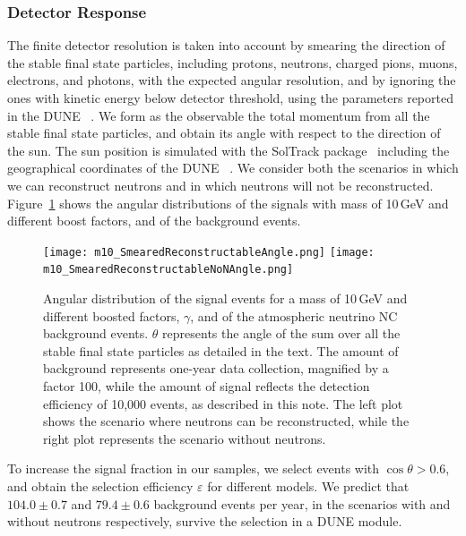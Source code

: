 \subsubsection{Detector Response}
\label{sec:detector_resp}

The finite detector resolution is taken into
account by smearing the direction of the stable final state particles, 
including protons, neutrons, charged pions, muons, electrons, and photons,
with the expected angular resolution,
and by ignoring the ones with kinetic energy below detector threshold,
using the parameters reported in the DUNE ~\cite{Acciarri:2015uup}.
We form as the observable the total momentum from all the stable final state particles,
and obtain its angle with respect to the direction of the sun.
The sun position is simulated with the SolTrack package~\cite{SolTrack}
including the geographical coordinates of the DUNE ~\cite{DUNE_DocDB136}.
We consider both the scenarios in which we can reconstruct neutrons and in which 
neutrons will not be reconstructed.
Figure~\ref{fig:m10_SmearedReconstructableAngle} shows the angular distributions of
the  signals with mass of 10\,GeV and different boost factors,
and of the background events.

\begin{figure}[!htb]
\centering
\texttt{[image: m10\_SmearedReconstructableAngle.png]}
\texttt{[image: m10\_SmearedReconstructableNoNAngle.png]}
\caption[Angular distribution of the BDM signal events for a BDM mass of 10\,GeV]{Angular distribution of the  signal events for a  mass of 10\,GeV
and different boosted factors, $\gamma$, and of the atmospheric neutrino NC
background events.
$\theta$ represents the angle of the sum over all the stable final state
particles as detailed in the text.
The amount of background represents one-year data collection, magnified by a factor 100,
while the amount of signal reflects the detection efficiency of 10,000  events, as
described in this note.
The left plot shows the scenario where neutrons can be reconstructed,
while the right plot represents the scenario without neutrons.}
\label{fig:m10_SmearedReconstructableAngle}
\end{figure}


To increase the signal fraction in our samples, we select events with $\cos\theta > 0.6$,
and obtain the selection efficiency $\varepsilon$ for different  models.
We predict that $104.0 \pm 0.7$ and $79.4 \pm 0.6$ background events per year, in the scenarios with and without neutrons respectively, survive the selection in a DUNE \nominalmodsize module.

